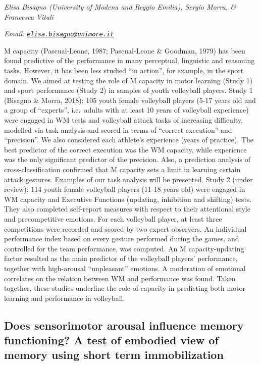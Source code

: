 \documentclass[12pt,]{book}
\begin{document}
\emph{Elisa Bisagno (University of Modena and Reggio Emilia), Sergio Morra, \& Francesca Vitali}

\emph{Email: \href{mailto:elisa.bisagno@unimore.it}{\nolinkurl{elisa.bisagno@unimore.it}}}

M capacity (Pascual-Leone, 1987; Pascual-Leone \& Goodman, 1979) has been found predictive of the performance in many perceptual, linguistic and reasoning tasks. However, it has been less studied ``in action'', for example, in the sport domain. We aimed at testing the role of M capacity in motor learning (Study 1) and sport performance (Study 2) in samples of youth volleyball players. Study 1 (Bisagno \& Morra, 2018): 105 youth female volleyball players (5-17 years old and a group of ``experts'', i.e.~adults with at least 10 years of volleyball experience) were engaged in WM tests and volleyball attack tasks of increasing difficulty, modelled via task analysis and scored in terms of ``correct execution'' and ``precision''. We also considered each athlete's experience (years of practice). The best predictor of the correct execution was the WM capacity, while experience was the only significant predictor of the precision. Also, a prediction analysis of cross-classification confirmed that M capacity sets a limit in learning certain attack gestures. Examples of our task analysis will be presented. Study 2 (under review): 114 youth female volleyball players (11-18 years old) were engaged in WM capacity and Executive Functions (updating, inhibition and shifting) tests. They also completed self-report measures with respect to their attentional style and precompetitive emotions. For each volleyball player, at least three competitions were recorded and scored by two expert observers. An individual performance index based on every gesture performed during the games, and controlled for the team performance, was computed. An M capacity-updating factor resulted as the main predictor of the volleyball players' performance, together with high-arousal ``unpleasant'' emotions. A moderation of emotional correlates on the relation between WM and performance was found. Taken together, these studies underline the role of capacity in predicting both motor learning and performance in volleyball.

\hypertarget{does-sensorimotor-arousal-influence-memory-functioning-a-test-of-embodied-view-of-memory-using-short-term-immobilization}{%
\subsection{Does sensorimotor arousal influence memory functioning? A test of embodied view of memory using short term immobilization}\label{does-sensorimotor-arousal-influence-memory-functioning-a-test-of-embodied-view-of-memory-using-short-term-immobilization}}
\end{document}
